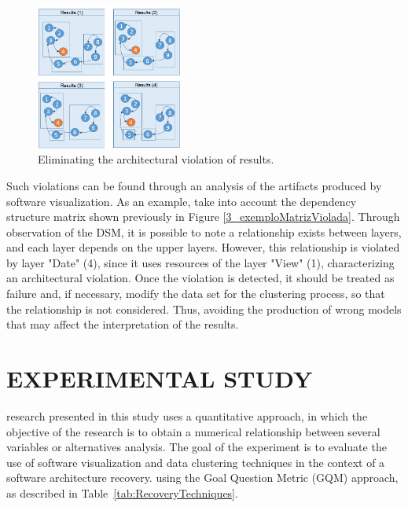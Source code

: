 \documentclass{sig-alternate-05-2015}
\begin{document}
\begin{figure}[!h]
	\centering
	\includegraphics[width=0.43\textwidth]{exemplo_comparacao_modelos_2_en}
	\caption{Eliminating the architectural violation of results.}
	\label{exemplo_comparacao_modelos2}
\end{figure}

Such violations can be found through an analysis of the artifacts produced by software visualization. As an example, take into account the dependency structure matrix shown previously in Figure \ref{3_exemploMatrizViolada}. Through observation of the DSM, it is possible to note a relationship exists between layers, and each layer depends on the upper layers. However, this relationship is violated by layer "Date" (4), since it uses resources of the layer  "View" (1), characterizing an architectural violation. Once the violation is detected, it should be treated as failure and, if necessary, modify the data set for the clustering process, so that the relationship is not considered. Thus, avoiding the production of wrong models that may affect the interpretation of the results.

\section{EXPERIMENTAL STUDY}

  research presented in this  study uses a quantitative approach, in which the objective of the research 
is to obtain a numerical relationship between several variables or alternatives analysis. The goal of the experiment is to evaluate the use of software visualization and data 
clustering techniques in the context of a software architecture recovery.  using the 
Goal Question Metric (GQM) approach, as described in Table~\ref{tab:RecoveryTechniques}.
\end{document}
